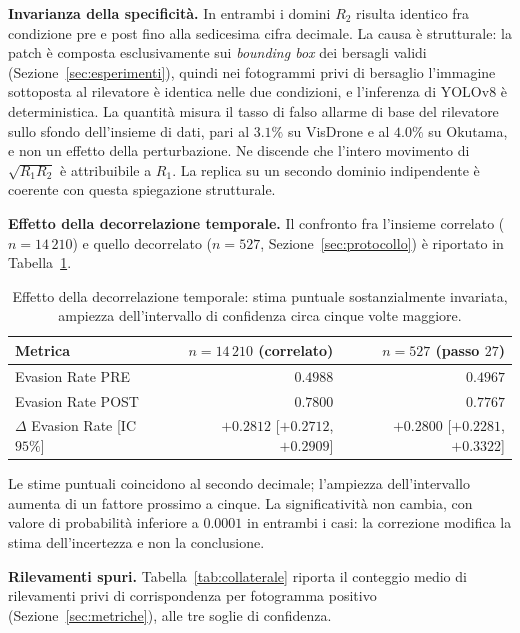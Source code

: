 \ifstampa\documentclass[a4paper,12pt,twoside,openright]{report}\else\documentclass[a4paper,12pt]{report}\fi
\newif\ifrevisione \revisionefalse
\DeclareRobustCommand{\rev}[1]{\ifrevisione{\color{blue!65!black}#1}\else#1\fi}
\begin{document}
\textbf{Invarianza della specificità.}
\label{sec:r2_invariante}
In entrambi i domini $R_2$ risulta identico fra condizione pre e post fino alla sedicesima cifra decimale. La causa è strutturale: la patch è composta esclusivamente sui \textit{bounding box} dei bersagli validi (Sezione~\ref{sec:esperimenti}), quindi nei fotogrammi privi di bersaglio l'immagine sottoposta al rilevatore è identica nelle due condizioni, e l'inferenza di YOLOv8 è deterministica. La quantità misura il tasso di falso allarme di base del rilevatore sullo sfondo dell'insieme di dati, pari al $3.1\%$ su VisDrone e al $4.0\%$ su Okutama, e non un effetto della perturbazione. Ne discende che l'intero movimento di $\sqrt{R_1 R_2}$ è attribuibile a $R_1$. \rev{La replica su un secondo dominio indipendente è coerente con questa spiegazione strutturale.}

\textbf{Effetto della decorrelazione temporale.}
\label{sec:risultato_decorrelazione}
Il confronto fra l'insieme correlato ($n = 14\,210$) e quello decorrelato ($n = 527$, Sezione~\ref{sec:protocollo}) è riportato in Tabella~\ref{tab:decorrelazione}.

\begin{table}[t]
\centering
\small
\begin{tabular}{lrr}
\toprule
Metrica & $n = 14\,210$ (correlato) & $n = 527$ (passo $27$) \\
\midrule
Evasion Rate PRE & $0.4988$ & $0.4967$ \\
Evasion Rate POST & $0.7800$ & $0.7767$ \\
$\Delta$ Evasion Rate [IC $95\%$] & $+0.2812$ [$+0.2712$, $+0.2909$] & $+0.2800$ [$+0.2281$, $+0.3322$] \\
\bottomrule
\end{tabular}
\caption{Effetto della decorrelazione temporale: stima puntuale sostanzialmente invariata, ampiezza dell'intervallo di confidenza circa cinque volte maggiore.}
\label{tab:decorrelazione}
\end{table}

Le stime puntuali coincidono al secondo decimale; l'ampiezza dell'intervallo aumenta di un fattore prossimo a cinque. La significatività non cambia, con valore di probabilità inferiore a $0.0001$ in entrambi i casi: la correzione modifica la stima dell'incertezza e non la conclusione.

\textbf{Rilevamenti spuri.}
\label{sec:risultato_collaterale}
Tabella~\ref{tab:collaterale} riporta il conteggio medio di rilevamenti privi di corrispondenza per fotogramma positivo (Sezione~\ref{sec:metriche}), alle tre soglie di confidenza.
\end{document}
